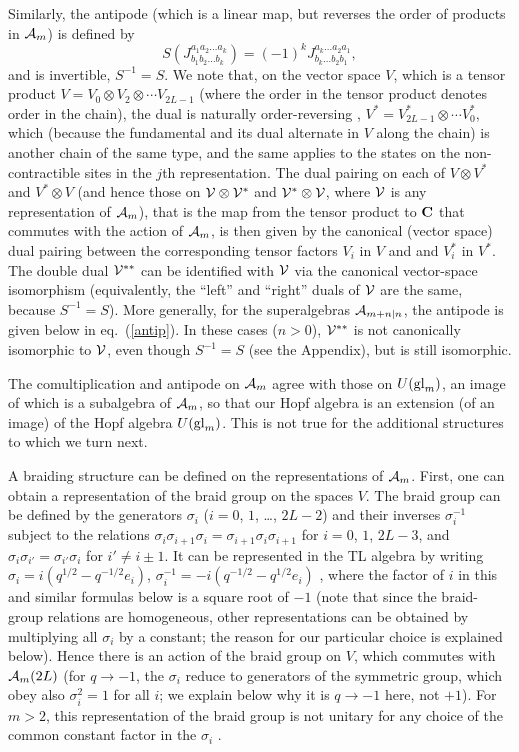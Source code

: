 \documentclass[twocolumn,floats,pra]{revtex4}
\def \cA {{\cal A}}
\newcommand {\be}{\begin{equation}}
\newcommand {\ee} {\end{equation}}
\begin{document}
Similarly, the antipode (which is a linear map, but reverses the
order of products in $\cA_m$) is defined by %
\be S(J^{a_1a_2\ldots a_k}_{b_1b_2\ldots b_k})=(-1)^k J^{a_k\ldots
a_2 a_1}_{b_k\ldots b_2 b_1},\ee %
and is invertible, $S^{-1}=S$. We note that, on the vector space
$V$, which is a tensor product $V=V_0\otimes V_2\otimes\cdots
V_{2L-1}$ (where the order in the tensor product denotes order in
the chain), the dual is naturally order-reversing \cite{kass},
$V^\ast=V_{2L-1}^\ast\otimes\cdots V_0^\ast$, which (because the
fundamental and its dual alternate in $V$ along the chain) is
another chain of the same type, and the same applies to the states
on the non-contractible sites in the $j$th representation. The
dual pairing on each of $V\otimes V^\ast$ and $V^\ast\otimes V$
(and hence those on ${\cal V}\otimes {\cal V}^\ast$ and ${\cal
V}^\ast\otimes {\cal V}$, where $\cal V$ is any representation of
$\cA_m$), that is the map from the tensor product to $\bf C$ that
commutes with the action of $\cA_m$, is then given by the
canonical (vector space) dual pairing between the corresponding
tensor factors $V_i$ in $V$ and and $V_i^\ast$ in $V^\ast$. The
double dual ${\cal V}^{\ast\ast}$ can be identified with $\cal V$
via the canonical vector-space isomorphism (equivalently, the
``left'' and ``right'' duals of $\cal V$ are the same, because
$S^{-1}=S$). More generally, for the superalgebras $\cA_{m+n|n}$,
the antipode is given below in eq.\ (\ref{antip}). In these cases
($n>0$), ${\cal V}^{\ast\ast}$ is not canonically isomorphic to
${\cal V}$, even though $S^{-1}=S$ (see the Appendix), but is
still isomorphic.

The comultiplication and antipode on $\cA_m$ agree with those on
$U({\rm gl}_m)$, an image of which is a subalgebra of $\cA_m$, so
that our Hopf algebra is an extension (of an image) of the Hopf
algebra $U({\rm gl}_m)$. This is not true for the additional
structures to which we turn next.

A braiding structure can be defined on the representations of
$\cA_m$. First, one can obtain a representation of the braid group
on the spaces $V$. The braid group can be defined by the
generators $\sigma_i$ ($i=0$, $1$, \ldots, $2L-2$) and their
inverses $\sigma_i^{-1}$ subject to the relations
$\sigma_i\sigma_{i+1}\sigma_i=\sigma_{i+1}\sigma_i\sigma_{i+1}$
for $i=0$, $1$, $2L-3$, and
$\sigma_{i}\sigma_{i'}=\sigma_{i'}\sigma_i$ for $i'\neq i\pm 1$.
It can be represented in the TL algebra by writing
$\sigma_i=i(q^{1/2}-q^{-1/2} e_i)$,
$\sigma_i^{-1}=-i(q^{-1/2}-q^{1/2}e_i)$ \cite{jones3,cfs}, where
the factor of $i$ in this and similar formulas below is a square
root of $-1$ (note that since the braid-group relations are
homogeneous, other representations can be obtained by multiplying
all $\sigma_i$ by a constant; the reason for our particular choice
is explained below). Hence there is an action of the braid group
on $V$, which commutes with $\cA_m(2L)$ (for $q\to-1$, the
$\sigma_i$ reduce to generators of the symmetric group, which obey
also $\sigma_i^2=1$ for all $i$; we explain below why it is $q\to
-1$ here, not $+1$). For $m>2$, this representation of the braid
group is not unitary for any choice of the common constant factor
in the $\sigma_i$ \cite{jones3}.
\end{document}

